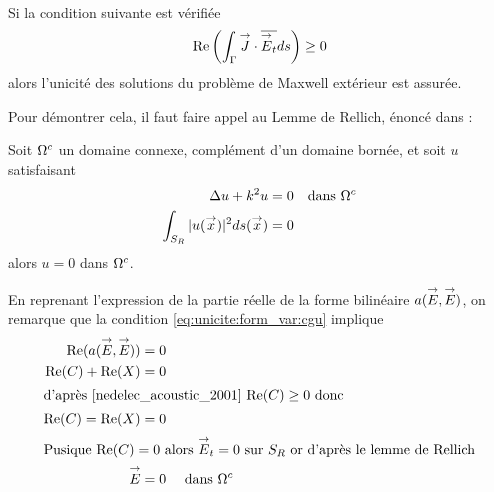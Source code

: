 


  \begin{prop}~\\
    Si la condition suivante est vérifiée
    \begin{equation}\label{eq:unicite:form_var:cgu}
      \operatorname{Re}\left(\int_\Gamma {\overset{\rightarrow}{J}} \cdot {\overline{{\overset{\rightarrow}{E}}_t}} ds\right) \ge 0
    \end{equation}
    alors l'unicité des solutions du problème de Maxwell extérieur est assurée.
  \end{prop}

  Pour démontrer cela, il faut faire appel au Lemme de Rellich, énoncé dans \cite[p.~74]{cessenat_mathematical_1996}:
  \begin{lemme}[Rellich]
    Soit \(\Omega^c\) un domaine connexe, complément d'un domaine bornée, et soit \(u\) satisfaisant
    \begin{subequations}
      \begin{align}
        \Delta u + k^2 u = 0 & &\text{dans \(\Omega^c\)}
        \\
        \int_{S_R} |u({\overset{\rightarrow}{x}})|^2 ds({\overset{\rightarrow}{x}}) = 0 
      \end{align}
    \end{subequations}
    alors \(u=0\) dans \(\Omega^c\).
  \end{lemme}

  En reprenant l'expression de la partie réelle de la forme bilinéaire \(a({\overset{\rightarrow}{E}},{\overset{\rightarrow}{E}})\), on remarque que la condition \eqref{eq:unicite:form_var:cgu} implique
  \begin{align}
    \Re(a(\vE,\vE)) & = 0
    \\
    \Re(C) + \Re(X) & = 0
    \\ \intertext{d'après \cite[eq.~5.3.89]{nedelec_acoustic_2001} \(\Re(C)\ge 0\) donc } 
    \Re(C) = \Re(X) & = 0
    \\ \intertext{Pusique \(\Re(C) = 0\) alors \(\vE_t = 0\) sur \(S_R\) or d'après le lemme de Rellich}
    \vE &= 0  &\text{ dans } \OO^c
  \end{align}

